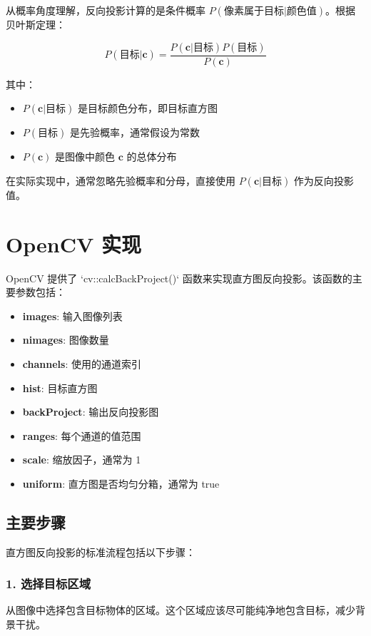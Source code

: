 \documentclass{article}
\begin{document}
从概率角度理解，反向投影计算的是条件概率 $P(\text{像素属于目标} | \text{颜色值})$。根据贝叶斯定理：

\begin{equation}
P(\text{目标} | \mathbf{c}) = \frac{P(\mathbf{c} | \text{目标}) P(\text{目标})}{P(\mathbf{c})}
\end{equation}

其中：
\begin{itemize}
    \item $P(\mathbf{c} | \text{目标})$ 是目标颜色分布，即目标直方图
    \item $P(\text{目标})$ 是先验概率，通常假设为常数
    \item $P(\mathbf{c})$ 是图像中颜色 $\mathbf{c}$ 的总体分布
\end{itemize}

在实际实现中，通常忽略先验概率和分母，直接使用 $P(\mathbf{c} | \text{目标})$ 作为反向投影值。

\section{OpenCV 实现}

OpenCV 提供了 `cv::calcBackProject()` 函数来实现直方图反向投影。该函数的主要参数包括：

\begin{itemize}
    \item \textbf{images}: 输入图像列表
    \item \textbf{nimages}: 图像数量
    \item \textbf{channels}: 使用的通道索引
    \item \textbf{hist}: 目标直方图
    \item \textbf{backProject}: 输出反向投影图
    \item \textbf{ranges}: 每个通道的值范围
    \item \textbf{scale}: 缩放因子，通常为 1
    \item \textbf{uniform}: 直方图是否均匀分箱，通常为 true
\end{itemize}

\subsection{主要步骤}

直方图反向投影的标准流程包括以下步骤：

\subsubsection{1. 选择目标区域}
从图像中选择包含目标物体的区域。这个区域应该尽可能纯净地包含目标，减少背景干扰。
\end{document}
